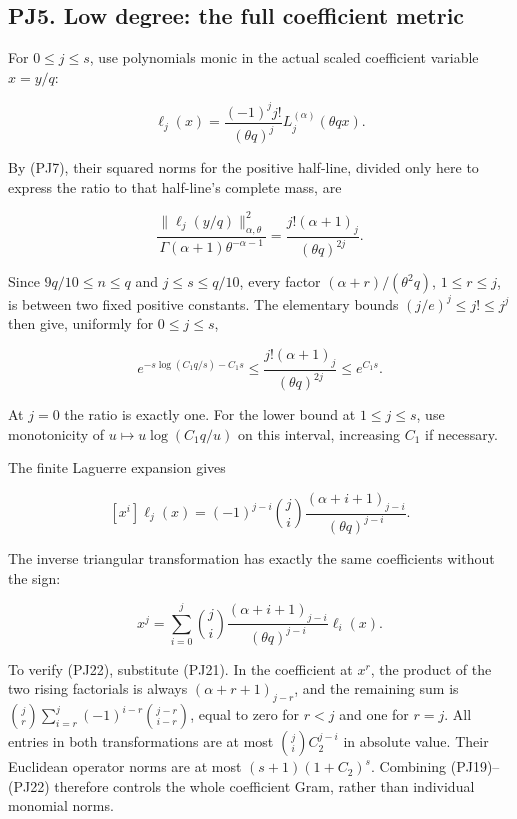\documentclass[10pt]{article}
\begin{document}
\subsection{PJ5. Low degree: the full coefficient metric}\label{pj5.-low-degree-the-full-coefficient-metric}

For \(0\le j\le s\), use polynomials monic in the actual scaled coefficient variable \(x=y/q\):

\[
\ell_j(x)=\frac{(-1)^j j!}{(\theta q)^j}L_j^{(\alpha)}(\theta qx).
\]

By (PJ7), their squared norms for the positive half-line, divided only here to express the ratio to that half-line's complete mass, are

\[
\frac{\|\ell_j(y/q)\|_{\alpha,\theta}^2}
{\Gamma(\alpha+1)\theta^{-\alpha-1}}
=\frac{j!(\alpha+1)_j}{(\theta q)^{2j}}.
\tag{PJ19}
\]

Since \(9q/10\le n\le q\) and \(j\le s\le q/10\), every factor \((\alpha+r)/(\theta^2q)\), \(1\le r\le j\), is between two fixed positive constants. The elementary bounds \((j/e)^j\le j!\le j^j\) then give, uniformly for \(0\le j\le s\),

\[
e^{-s\log(C_1q/s)-C_1s}
\le\frac{j!(\alpha+1)_j}{(\theta q)^{2j}}\le e^{C_1s}.
\tag{PJ20}
\]

At \(j=0\) the ratio is exactly one. For the lower bound at \(1\le j\le s\), use monotonicity of \(u\mapsto u\log(C_1q/u)\) on this interval, increasing \(C_1\) if necessary.

The finite Laguerre expansion gives

\[
[x^i]\ell_j(x)
=(-1)^{j-i}\binom ji\frac{(\alpha+i+1)_{j-i}}{(\theta q)^{j-i}}.
\tag{PJ21}
\]

The inverse triangular transformation has exactly the same coefficients without the sign:

\[
x^j=\sum_{i=0}^j\binom ji
\frac{(\alpha+i+1)_{j-i}}{(\theta q)^{j-i}}\ell_i(x).
\tag{PJ22}
\]

To verify (PJ22), substitute (PJ21). In the coefficient at \(x^r\), the product of the two rising factorials is always \((\alpha+r+1)_{j-r}\), and the remaining sum is \(\binom jr\sum_{i=r}^j(-1)^{i-r}\binom{j-r}{i-r}\), equal to zero for \(r<j\) and one for \(r=j\). All entries in both transformations are at most \(\binom jiC_2^{j-i}\) in absolute value. Their Euclidean operator norms are at most \((s+1)(1+C_2)^s\). Combining (PJ19)--(PJ22) therefore controls the whole coefficient Gram, rather than individual monomial norms.
\end{document}
